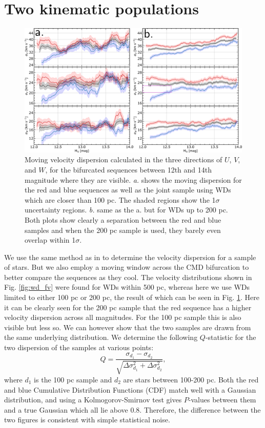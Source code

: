 \section{Two kinematic populations}\label{sec:p2-populations}
\begin{figure}[t]
    \centering
    \includegraphics[width=1\textwidth]{images/moving_dispersion.pdf}
    \caption{Moving velocity dispersion calculated in the three directions of $U$, $V$, and $W$, for the bifurcated sequences between 12th and 14th magnitude where they are visible. \textit{a.} shows the moving dispersion for the red and blue sequences as well as the joint sample using WDs which are closer than 100 pc. The shaded regions show the 1$\sigma$ uncertainty regions. \textit{b.} same as the a. but for WDs up to 200 pc. Both plots show clearly a separation between the red and blue samples and when the 200 pc sample is used, they barely even overlap within 1$\sigma$.} %
    \label{fig:moving_disp}
\end{figure}
We use the same method as in \cite{dehnen:98b} to determine the velocity dispersion for a sample of stars. But we also employ a moving window across the CMD bifurcation to better compare the sequences as they cool. The velocity distributions shown in Fig. \ref{fig:wd_fv} were found for WDs within 500 pc, whereas here we use WDs limited to either 100 pc or 200 pc, the result of which can be seen in Fig. \ref{fig:moving_disp}. Here it can be clearly seen for the 200 pc sample that the red sequence has a higher velocity dispersion across all magnitudes. For the 100 pc sample this is also visible but less so. We can however show that the two samples are drawn from the same underlying distribution. We determine the following $Q$-statistic for the two dispersion of the samples at various points: 
\begin{equation}
    Q = \frac{\sigma_{d_1} - \sigma_{d_2}}{\sqrt{\Delta \sigma_{d_1}^2 + \Delta \sigma_{d_2}^2}},
\end{equation}
where $d_1$ is the 100 pc sample and $d_2$ are stars between 100-200 pc. Both the red and blue Cumulative Distribution Functions (CDF) match well with a Gaussian distribution, and using a Kolmogorov-Smirnov test gives $P$-values between them and a true Gaussian which all lie above 0.8. Therefore, the difference between the two figures is consistent with simple statistical noise. 

